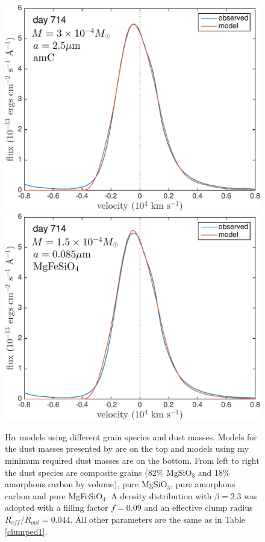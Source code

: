 \begin{landscape}
\begin{figure}
\includegraphics[trim =24 0 0 -10,clip=true,scale=0.33]{chapters/chapter5/images/silicates_take2/AmC_bestfit_Ha.pdf}
\includegraphics[trim =24 0 0 -10,clip=true,scale=0.33]{chapters/chapter5/images/silicates_take2/MgFeSiO4_bestfit_Ha.pdf}
\caption{H$\alpha$ models using different grain species and dust masses.   
Models for the dust masses presented by \citet{Dwek2015} are on the top and models 
using my minimum required dust masses are on the bottom.  From left to 
right the dust species are composite grains (82\% MgSiO$_3$ and 18\% 
amorphous carbon by volume), pure MgSiO$_3$, pure amorphous carbon and pure 
MgFeSiO$_4$. A density distribution with $\beta=2.3$ was adopted with a 
filling factor $f=0.09$ and an effective clump radius 
$R_{eff}/R_{out}=0.044$.  All other parameters are the same as in Table 
\ref{clumped1}.}
\label{Dwek_models_Ha}
\end{figure}
\end{landscape}

